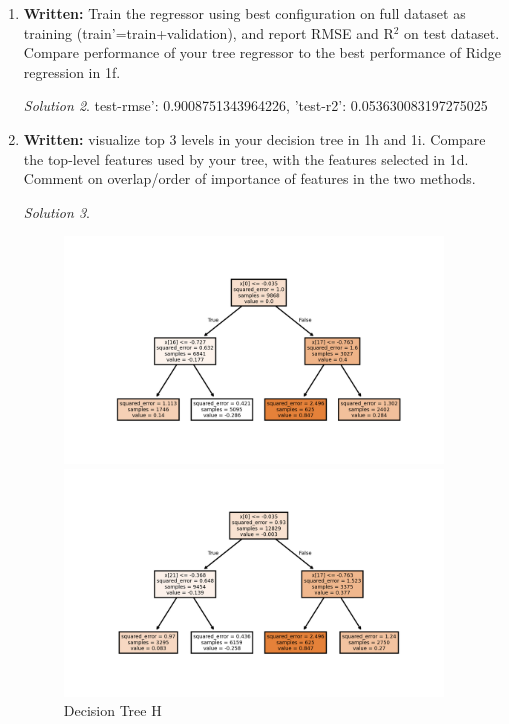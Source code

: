 \documentclass[a4paper,12pt]{article}
\theoremstyle{definition}
\theoremstyle{remark}
\newtheorem*{solution}{Solution}
\begin{document}
\begin{enumerate}
\begin{enumerate}
\begin{solution}
			
			\end{solution}
			\item {\bf Written:} Train the regressor using best configuration on full dataset as training (train’=train+validation), and report RMSE and R$^2$ on test dataset. Compare performance of your tree regressor to the best performance of Ridge regression in 1f.
			\begin{solution}
				test-rmse': 0.9008751343964226, 'test-r2': 0.053630083197275025
			\end{solution}
			\item {\bf Written:} visualize top 3 levels in your decision tree in 1h and 1i. Compare the top-level features used by your
			tree, with the features selected in 1d. Comment on overlap/order of importance of features in the two methods.
			\begin{solution}
				\begin{figure}
				\centering
				\begin{minipage}{0.49\textwidth}
					\centering
					\includegraphics[width=0.95\textwidth]{../decision_tree_h}
					\caption{Decision Tree H}
				\end{minipage}\hfill
				\begin{minipage}{0.49\textwidth}
					\centering
					\includegraphics[width=0.95\textwidth]{../decision_tree_i} %

\end{minipage}
\end{figure}
\end{solution}
\end{enumerate}
\end{enumerate}
\end{document}
